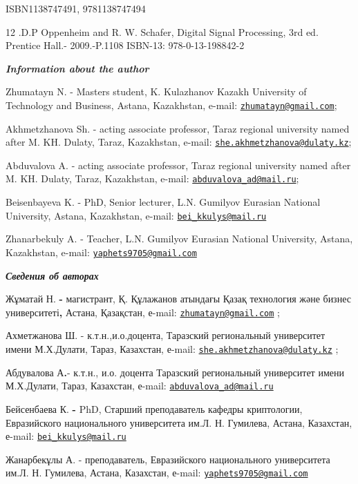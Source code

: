 \documentclass[
]{article}
\begin{document}
ISBN1138747491, 9781138747494

12 .D.P Oppenheim and R. W. Schafer, Digital Signal Processing, 3rd ed.
Prentice Hall.- 2009.-P.1108 ISBN-13: 978-0-13-198842-2

\emph{\textbf{Information about the author}}

Zhumatayn N. - Master\textquotesingle s student, K. Kulazhanov Kazakh
University of Technology and Business, Astana, Kazakhstan, e-mail:
\href{mailto:zhumatayn@gmail.com}{\nolinkurl{zhumatayn@gmail.com}};

Akhmetzhanova Sh. - acting associate professor, Taraz regional
university named after M. KH. Dulaty, Taraz, Kazakhstan, e-mail:
\href{mailto:she.akhmetzhanova@dulaty.kz}{\nolinkurl{she.akhmetzhanova@dulaty.kz}};

Abduvalova A. - acting associate professor, Taraz regional university
named after M. KH. Dulaty, Taraz, Kazakhstan, e-mail:
\href{mailto:abduvalova_ad@mail.ru}{\nolinkurl{abduvalova\_ad@mail.ru}};

Beisenbayeva K. - PhD, Senior lecturer, L.N. Gumilyov Eurasian National
University, Astana, Kazakhstan, e-mail:
\href{mailto:bei_kkulys@mail.ru}{\nolinkurl{bei\_kkulys@mail.ru}}

Zhanarbekuly A. - Teacher, L.N. Gumilyov Eurasian National University,
Astana, Kazakhstan, e-mail:
\href{mailto:yaphets9705@gmail.com}{\nolinkurl{yaphets9705@gmail.com}}

\emph{\textbf{Сведения об авторах}}

Жұматай Н. \textbf{-} магистрант, Қ. Құлажанов атындағы Қазақ технология
және бизнес университеті\textbf{,} Астана, Қазақстан, е-mail:
\href{mailto:zhumatayn@gmail.com}{\nolinkurl{zhumatayn@gmail.com}} ;

Ахметжанова Ш. - к.т.н.,и.о.доцента, Таразский региональный университет
имени М.Х.Дулати, Тараз, Казахстан, е-mail:
\href{mailto:she.akhmetzhanova@dulaty.kz}{\nolinkurl{she.akhmetzhanova@dulaty.kz}}
;

Абдувалова А\textbf{.}- к.т.н., и.о. доцента Таразский региональный
университет имени М.Х.Дулати, Тараз, Казахстан, е-mail:
\href{mailto:abduvalova_ad@mail.ru}{\nolinkurl{abduvalova\_ad@mail.ru}}

Бейсенбаева К. \textbf{-} PhD, Старший преподаватель кафедры
криптологии, Евразийского национального университета им.Л. Н. Гумилева,
Астана, Казахстан, е-mail:
\href{mailto:bei_kkulys@mail.ru}{\nolinkurl{bei\_kkulys@mail.ru}}

Жанарбекұлы А. - преподаватель, Евразийского национального университета
им.Л. Н. Гумилева, Астана, Казахстан, е-mail:
\href{mailto:yaphets9705@gmail.com}{\nolinkurl{yaphets9705@gmail.com}}
\end{document}
